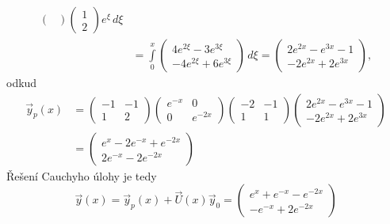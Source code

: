 \begin{sol}
\[\begin{split}
\begin{pmatrix}
                      \end{pmatrix}
                      \begin{pmatrix}
                         1 \\ 2
                      \end{pmatrix}
                      e^{\xi}
                      \,d\xi\\
                   &=\int\limits_{0}^x
                      \begin{pmatrix}
                         4e^{2\xi}-3e^{3\xi}\\
                         -4e^{2\xi}+6e^{3\xi}
                      \end{pmatrix}
                      \,d\xi
                   =\begin{pmatrix}
                      2e^{2x}-e^{3x}-1\\
                      -2e^{2x}+2e^{3x}
                   \end{pmatrix},
      \end{split}
   \]
   odkud
   \[
      \begin{split}
      \vec{y}_p(x) &= 
      \begin{pmatrix}
         -1 &  -1\\
         1 &  2
      \end{pmatrix}
      \begin{pmatrix}
         e^{-x} &  0\\
         0 &  e^{-2x}
      \end{pmatrix}
      \begin{pmatrix}
         -2 & -1\\
          1 &  1
      \end{pmatrix}
      \begin{pmatrix}
            2e^{2x}-e^{3x}-1\\
            -2e^{2x}+2e^{3x}
      \end{pmatrix}\\
      &=
      \begin{pmatrix}
         e^{x}-2e^{-x}+e^{-2x}\\
         2e^{-x}-2e^{-2x}
      \end{pmatrix}
      \end{split}
   \]
   Řešení Cauchyho úlohy je tedy
   \[
      \vec{y}(x) = \vec{y}_p(x) + \vec{U}(x)\vec{y}_0
       =\begin{pmatrix}
         e^{x}+e^{-x}-e^{-2x}\\
         -e^{-x}+2e^{-2x}
       \end{pmatrix}
   \]
\end{sol}



